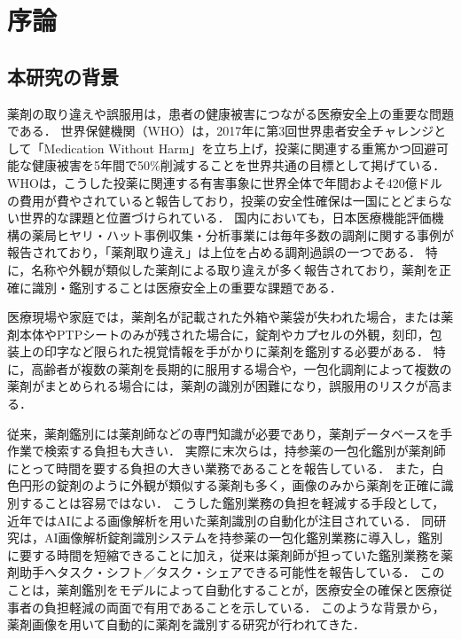 \documentclass{jsarticle}
\begin{document}
\newpage

\tableofcontents
\newpage
\setcounter{page}{1}
\pagestyle{plain}

\section{序論}\label{sec1}

\subsection{本研究の背景}

薬剤の取り違えや誤服用は，患者の健康被害につながる医療安全上の重要な問題である．
世界保健機関（WHO）は，2017年に第3回世界患者安全チャレンジとして「Medication Without Harm」を立ち上げ，投薬に関連する重篤かつ回避可能な健康被害を5年間で50\%削減することを世界共通の目標として掲げている\cite{who_medication}．
WHOは，こうした投薬に関連する有害事象に世界全体で年間およそ420億ドルの費用が費やされていると報告しており，投薬の安全性確保は一国にとどまらない世界的な課題と位置づけられている．
国内においても，日本医療機能評価機構の薬局ヒヤリ・ハット事例収集・分析事業には毎年多数の調剤に関する事例が報告されており，「薬剤取り違え」は上位を占める調剤過誤の一つである\cite{jcqhc_hiyari}．
特に，名称や外観が類似した薬剤による取り違えが多く報告されており，薬剤を正確に識別・鑑別することは医療安全上の重要な課題である．

医療現場や家庭では，薬剤名が記載された外箱や薬袋が失われた場合，または薬剤本体やPTPシートのみが残された場合に，錠剤やカプセルの外観，刻印，包装上の印字など限られた視覚情報を手がかりに薬剤を鑑別する必要がある．
特に，高齢者が複数の薬剤を長期的に服用する場合や，一包化調剤によって複数の薬剤がまとめられる場合には，薬剤の識別が困難になり，誤服用のリスクが高まる．

従来，薬剤鑑別には薬剤師などの専門知識が必要であり，薬剤データベースを手作業で検索する負担も大きい．
実際に末次ら\cite{suetsugu2026ai}は，持参薬の一包化鑑別が薬剤師にとって時間を要する負担の大きい業務であることを報告している．
また，白色円形の錠剤のように外観が類似する薬剤も多く，画像のみから薬剤を正確に識別することは容易ではない．
こうした鑑別業務の負担を軽減する手段として，近年ではAIによる画像解析を用いた薬剤識別の自動化が注目されている．
同研究\cite{suetsugu2026ai}は，AI画像解析錠剤識別システムを持参薬の一包化鑑別業務に導入し，鑑別に要する時間を短縮できることに加え，従来は薬剤師が担っていた鑑別業務を薬剤助手へタスク・シフト／タスク・シェアできる可能性を報告している．
このことは，薬剤鑑別をモデルによって自動化することが，医療安全の確保と医療従事者の負担軽減の両面で有用であることを示している．
このような背景から，薬剤画像を用いて自動的に薬剤を識別する研究が行われてきた．
\end{document}
